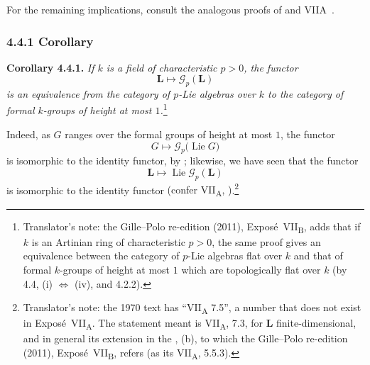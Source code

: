 For the remaining implications, consult the analogous proofs of
 and VIIA~.


\subsubsection*{4.4.1 Corollary}
\label{sga3:VIIB:4.4.1}

\noindent\textbf{Corollary 4.4.1.}
{\itshape If \(k\) is a field of characteristic \(p>0\), the functor
\[
  \mathbf L\longmapsto\mathscr G_p(\mathbf L)
\]
is an equivalence from the category of \(p\)-Lie algebras over
\(k\) to the category of formal \(k\)-groups of height at most
\(1\).}\footnote{Translator's note: the Gille--Polo re-edition (2011), Expos\'e~VII\textsubscript{B}, adds
that if \(k\) is an Artinian ring of characteristic \(p>0\), the same proof gives an equivalence between the
category of \(p\)-Lie algebras flat over \(k\) and that of formal \(k\)-groups of height at most \(1\) which
are topologically flat over \(k\) (by 4.4, (i) \(\Leftrightarrow\) (iv), and 4.2.2).}

Indeed, as \(G\) ranges over the formal groups of height at most
\(1\), the functor
\[
  G\longmapsto\mathscr G_p\bigl(\operatorname{Lie}G\bigr)
\]
is isomorphic to the identity functor, by ; likewise, we
have seen that the functor
\[
  \mathbf L\longmapsto
  \operatorname{Lie}\mathscr G_p(\mathbf L)
\]
is isomorphic to the identity functor \textup{(confer VII\textsubscript{A},
)}.\footnote{Translator's note: the 1970 text has ``VII\textsubscript{A} 7.5'', a
number that does not exist in Expos\'e~VII\textsubscript{A}. The statement meant is VII\textsubscript{A}, 7.3,
for \(\mathbf L\) finite-dimensional, and in general its extension in the
, (b), to which the Gille--Polo
re-edition (2011), Expos\'e~VII\textsubscript{B}, refers (as its VII\textsubscript{A}, 5.5.3).}
